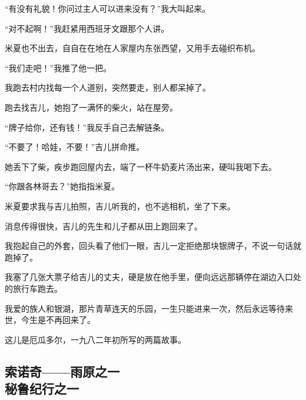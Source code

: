 \par “有没有礼貌！你问过主人可以进来没有？”我大叫起来。
\par “对不起啊！”我赶紧用西班牙文跟那个人讲。
\par 米夏也不出去，自自在在地在人家屋内东张西望，又用手去碰织布机。
\par “我们走吧！”我推了他一把。
\par 我跑去村内找每一个人道别，突然要走，别人都呆掉了。
\par 跑去找吉儿，她抱了一满怀的柴火，站在屋旁。
\par “牌子给你，还有钱！”我反手自己去解链条。
\par “不要了！哈娃，不要！”吉儿拼命推。
\par 她丢下了柴，疾步跑回屋内去，端了一杯牛奶麦片汤出来，硬叫我喝下去。
\par “你跟各林哥去？”她指指米夏。
\par 米夏要求我与吉儿拍照，吉儿听我的，也不逃相机，坐了下来。
\par 消息传得很快，吉儿的先生和儿子都从田上跑回来了。
\par 我抱起自己的外套，回头看了他们一眼，吉儿一定拒绝那块银牌子，不说一句话就跑掉了。
\par 我塞了几张大票子给吉儿的丈夫，硬是放在他手里，便向远远那辆停在湖边入口处的旅行车跑去。
\par 我爱的族人和银湖，那片青草连天的乐园，一生只能进来一次，然后永远等待来世，今生是不再回来了。
\par 这儿是厄瓜多尔，一九八二年初所写的两篇故事。



\subsection{索诺奇——雨原之一\\\small{秘鲁纪行之一}}


